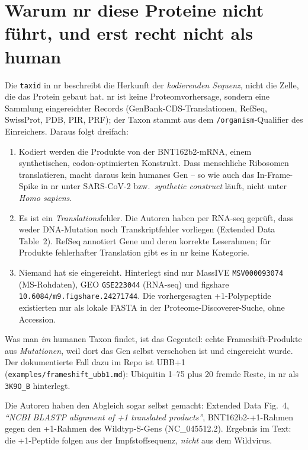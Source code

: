 \documentclass[11pt,a4paper]{article}
\begin{document}
\section{Warum nr diese Proteine nicht führt, und erst recht nicht als human}

Die \texttt{taxid} in nr beschreibt die Herkunft der \emph{kodierenden
Sequenz}, nicht die Zelle, die das Protein gebaut hat. nr ist keine
Proteomvorhersage, sondern eine Sammlung eingereichter Records
(GenBank-CDS-Translationen, RefSeq, SwissProt, PDB, PIR, PRF); der Taxon stammt
aus dem \texttt{/organism}-Qualifier des Einreichers. Daraus folgt dreifach:

\begin{enumerate}
\item Kodiert werden die Produkte von der BNT162b2-mRNA, einem synthetischen,
      codon-optimierten Konstrukt. Dass menschliche Ribosomen translatieren,
      macht daraus kein humanes Gen -- so wie auch das In-Frame-Spike in nr
      unter SARS-CoV-2 bzw.\ \emph{synthetic construct} läuft, nicht unter
      \emph{Homo sapiens}.
\item Es ist ein \emph{Translations}fehler. Die Autoren haben per RNA-seq
      geprüft, dass weder DNA-Mutation noch Transkriptfehler vorliegen
      (Extended Data Table~2). RefSeq annotiert Gene und deren korrekte
      Leserahmen; für Produkte fehlerhafter Translation gibt es in nr keine
      Kategorie.
\item Niemand hat sie eingereicht. Hinterlegt sind nur MassIVE
      \texttt{MSV000093074} (MS-Rohdaten), GEO \texttt{GSE223044} (RNA-seq) und
      figshare \texttt{10.6084/m9.figshare.24271744}. Die vorhergesagten
      +1-Polypeptide existierten nur als lokale FASTA in der
      Proteome-Discoverer-Suche, ohne Accession.
\end{enumerate}

Was man \emph{im} humanen Taxon findet, ist das Gegenteil: echte
Frameshift-Produkte aus \emph{Mutationen}, weil dort das Gen selbst verschoben
ist und eingereicht wurde. Der dokumentierte Fall dazu im Repo ist UBB+1
(\texttt{examples/frameshift\_ubb1.md}): Ubiquitin 1--75 plus 20 fremde Reste,
in nr als \texttt{3K9O\_B} hinterlegt.

Die Autoren haben den Abgleich sogar selbst gemacht: Extended Data Fig.~4,
\emph{``NCBI BLASTP alignment of +1 translated products''}, BNT162b2-+1-Rahmen
gegen den +1-Rahmen des Wildtyp-S-Gens (NC\_045512.2). Ergebnis im Text: die
+1-Peptide folgen aus der Impfstoffsequenz, \emph{nicht} aus dem Wildvirus.
\end{document}
